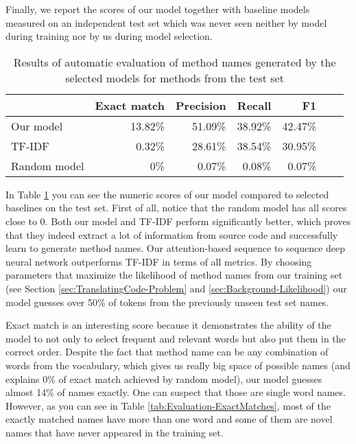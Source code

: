 Finally, we report the scores of our model together with baseline models measured on an independent test set which was never seen neither by model during training nor by us during model selection.

\begin{table}[H]
\centering
\begin{tabular}{|l|r|r|r|r|r|r|}
  \hline
  & Exact match & Precision & Recall & F1 \\
  \hline
  Our model & 13.82\% & 51.09\% & 38.92\% & 42.47\% \\
  \hline
  TF-IDF & 0.32\% & 28.61\% & 38.54\% & 30.95\% \\
  \hline
  Random model & 0\% & 0.07\% & 0.08\% & 0.07\% \\
  \hline
\end{tabular}
\caption{Results of automatic evaluation of method names generated by the selected models for methods from the test set}
\label{tab:Evaluation-TestResults}
\end{table}

In Table \ref{tab:Evaluation-TestResults} you can see the numeric scores of our model compared to selected baselines on the test set. First of all, notice that the random model has all scores close to 0. Both our model and TF-IDF perform significantly better, which proves that they indeed extract a lot of information from source code and successfully learn to generate method names. Our attention-based sequence to sequence deep neural network outperforms TF-IDF in terms of all metrics. By choosing parameters that maximize the likelihood of method names from our training set (see Section \ref{sec:TranslatingCode-Problem} and \ref{sec:Background-Likelihood}) our model guesses over 50\% of tokens from the previously unseen test set names.

Exact match is an interesting score because it demonstrates the ability of the model to not only to select frequent and relevant words but also put them in the correct order. Despite the fact that method name can be any combination of words from the vocabulary, which gives us really big space of possible names (and explains 0\% of exact match achieved by random model), our model guesses almost 14\% of names exactly. One can suspect that those are single word names. However, as you can see in Table \ref{tab:Evaluation-ExactMatches},  most of the exactly matched names have more than one word and some of them are novel names that have never appeared in the training set.


